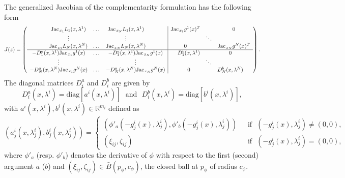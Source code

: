 \documentclass[11pt, a4paper]{article}
\newcommand{\txtm}[1]{\textrm{~~#1~~}}
\newcommand{\diag}{\textrm{diag}}
\newcommand{\Jac}{\textrm{Jac\hskip+.1em}}
\newcommand{\R}{\ensuremath{\mathbb{R}}}
\begin{document}
The generalized Jacobian of the complementarity formulation has the following form
$$
J(z) =
\left(
\begin{array}{c|c}
	\begin{matrix}
	\Jac_{x_1} L_1(x, \lambda^1)  & \dots & \Jac_{x_N} L_1(x, \lambda^1)  \\
	\vdots & & \vdots \\
	\Jac_{x_1} L_N(x, \lambda^N)  & \dots & \Jac_{x_N} L_N(x, \lambda^N)  \\
	\end{matrix}
&
	\begin{matrix}
	\Jac_{x_1} g^1(x)^T & & 0 \\
	& \ddots & \\
	0 & & \Jac_{x_N} g^N(x)^T \\
	\end{matrix}	
\\
\hline 
	\begin{matrix}	
	- D_1^a(x, \lambda^1) \Jac_{x_1} g^1(x) & \dots & - D_1^a(x, \lambda^1) \Jac_{x_N} g^1(x) \\
	\vdots & & \vdots \\
	- D_N^a(x, \lambda^N) \Jac_{x_1} g^N(x) & \dots & - D_N^a(x, \lambda^N) \Jac_{x_N} g^N(x) \\
	\end{matrix}		
&
	\begin{matrix}	
	 D^b_{1}(x, \lambda^1) & & 0 \\
	 & \ddots &  \\
	0  &  &  D^b_{N}(x, \lambda^N) \\
	\end{matrix}			
\end{array}	
\right) .
$$
The diagonal matrices $D_i^a$ and $D_i^b$ are given by
$$
D_i^a(x, \lambda^i) = \diag[ a^i(x, \lambda^i) ]
\txtm{and}
D_i^b(x, \lambda^i) = \diag[ b^i(x, \lambda^i) ],
$$
with $a^i(x, \lambda^i), b^i(x, \lambda^i) \in \R^{m_i}$  defined as
$$
( a^i_j(x, \lambda_j^i) , b^i_j(x, \lambda_j^i) ) = 
\left\{
\begin{array}{cl} %
\left(  \phi'_a( -g^i_j(x), \lambda_j^i ), \phi'_b ( -g^i_j(x), \lambda_j^i ) \right) 
& \txtm{if} ( -g^i_j(x), \lambda_j^i ) \neq (0, 0), \\
  (\xi_{ij} , \zeta_{ij} )
& \txtm{if} ( -g^i_j(x), \lambda_j^i ) = (0, 0), 
\end{array}
\right.
$$
where $\phi'_a$ (resp. $\phi'_b$) denotes the derivative of $\phi$ with respect to the first (second) argument $a$ ($b$)  and $(\xi_{ij} , \zeta_{ij} ) \in \bar B(p_\phi, c_\phi)$, the closed ball at $p_\phi$ of radius $c_\phi$. 
\end{document}
